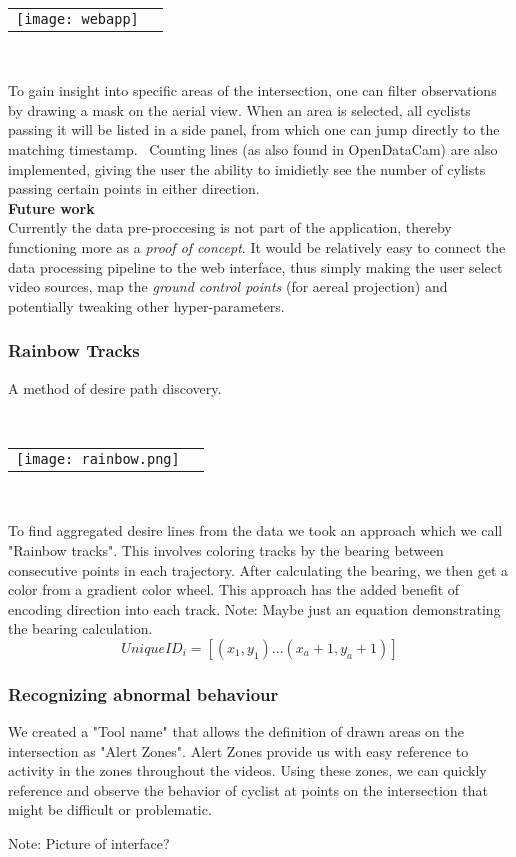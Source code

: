 \ \\ 
\raggedbottom
\begin{tabular}{@{}cc}
\texttt{[image: webapp]} 
\end{tabular}
\label{webapp}
\

To gain insight into specific areas of the intersection, one can filter observations by drawing a mask on the aerial view. 
When an area is selected, all cyclists passing it will be listed in a side panel, from which one can jump directly to the matching timestamp.
\
Counting lines (as also found in OpenDataCam) are also implemented, giving the user the ability to imidietly see the number of 
cylists passing certain points in either direction.
\ \\

\textbf{Future work} \\
Currently the data pre-proccesing is not part of the application, thereby functioning more as a \textit{proof of concept}.
It would be relatively easy to connect the data processing pipeline to the web interface, thus simply making the user 
select video sources, map the \textit{ground control points} (for aereal projection) and potentially tweaking other hyper-parameters. 

\subsubsection{Rainbow Tracks}
A method of desire path discovery.

\ \\ 
\noindent
\begin{tabular}{@{}cc}
\texttt{[image: rainbow.png]} 
\end{tabular}
\label{Rainbow}
\

To find aggregated desire lines from the data we took an approach which we call "Rainbow tracks". This involves coloring tracks by the bearing between consecutive points in each trajectory. After calculating the bearing, we then get a color from a gradient color wheel. This approach has the added benefit of encoding direction into 
each track.
Note: Maybe just an equation demonstrating the bearing calculation.
\ \\ 

\begin{equation}
  UniqueID_i = [(x_1, y_1)...(x_a+1, y_a+1)]\label{eq:3}
\end{equation}

\subsubsection{Recognizing abnormal behaviour}

We created a "Tool name" that allows the definition of drawn areas on the intersection as "Alert Zones". 
Alert Zones provide us with easy reference to activity in the zones throughout the videos. 
Using these zones, we can quickly reference and observe the behavior of cyclist at points on the 
intersection that might be difficult or problematic.

Note: Picture of interface?